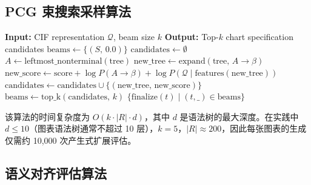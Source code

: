 \documentclass[12pt,a4paper]{ctexart}
\theoremstyle{remark}
\begin{document}
\subsection{PCG 束搜索采样算法}

\begin{algorithm}[H]
\caption{PCG-BeamSearch：基于 PCG 的图表规约束搜索}
\label{alg:beam}
\begin{algorithmic}[1]
\State \textbf{Input:} CIF representation $\mathcal{Q}$, beam size $k$
\State \textbf{Output:} Top-$k$ chart specification candidates
\State
\State $\text{beams} \gets \{ (S,\, 0.0) \}$ 
    \State $\text{candidates} \gets \emptyset$
        \State $A \gets \text{leftmost\_nonterminal}(\text{tree})$
            \State $\text{new\_tree} \gets \text{expand}(\text{tree},\, A \to \beta)$
            \State $\text{new\_score} \gets \text{score} + \log P(A \to \beta) + \log P(\mathcal{Q} \mid \text{features}(\text{new\_tree}))$
            \State $\text{candidates} \gets \text{candidates} \cup \{(\text{new\_tree},\, \text{new\_score})\}$
        \EndFor
    \EndFor
    \State $\text{beams} \gets \text{top\_k}(\text{candidates},\, k)$
\EndWhile
\State \Return $\{ \text{finalize}(t) \mid (t, \_) \in \text{beams} \}$
\end{algorithmic}
\end{algorithm}

该算法的时间复杂度为 $O(k \cdot |R| \cdot d)$，其中 $d$ 是语法树的最大深度。在实践中 $d \leq 10$（图表语法树通常不超过 10 层），$k = 5$，$|R| \approx 200$，因此每张图表的生成仅需约 10,000 次产生式扩展评估。

\subsection{语义对齐评估算法}
\end{document}
